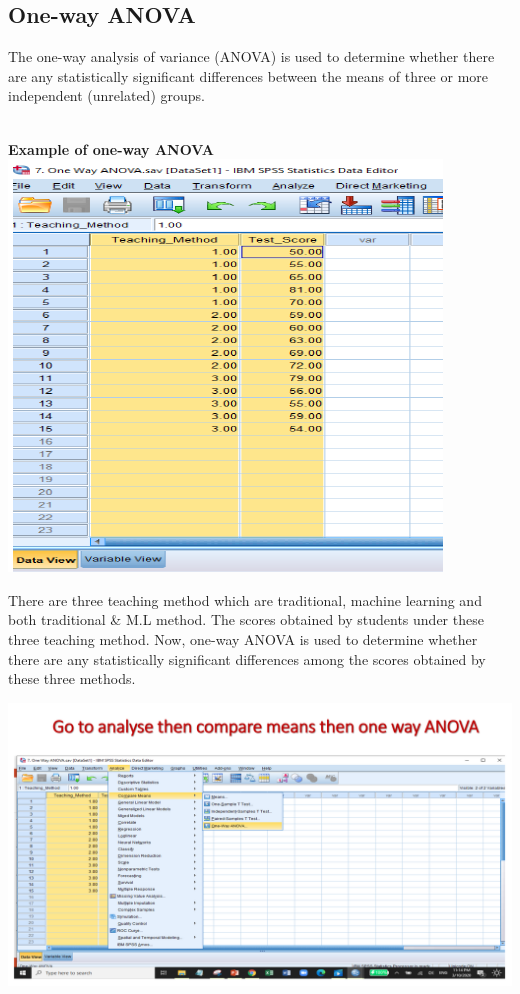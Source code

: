 \documentclass[
  letterpaper,
  DIV=11,
  numbers=noendperiod]{scrreprt}
\begin{document}
\subsection{One-way ANOVA}\label{one-way-anova}

\hfill\break
The one-way analysis of variance (ANOVA) is used to determine whether
there are any statistically significant differences between the means of
three or more independent (unrelated) groups.\\
\strut \\
\textbf{Example of one-way ANOVA}\\

\includegraphics{images/anova.png}

There are three teaching method which are traditional, machine learning
and both traditional \& M.L method. The scores obtained by students
under these three teaching method. Now, one-way ANOVA is used to
determine whether there are any statistically significant differences
among the scores obtained by these three methods.

\includegraphics{images/slides/img_Page_110.png}
\end{document}
